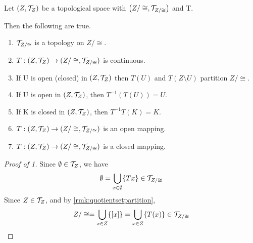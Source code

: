 
\begin{prop}
    \label{prop:QuotientSpaceTopology}
    
    Let $(Z,\mathcal{T}_Z)$ be a topological space 
    with \QuotientTopologicalSpace  $\left( Z/\cong, \mathcal{T}_{Z/\cong}\right)$
    and \QuotientMap T.
    
    Then the following are true. 
    \begin{enumerate}
        \item $\mathcal{T}_{Z/\cong}$ is a topology on $Z/\cong$. 
        \item $T:(Z, \mathcal{T}_Z) \to (Z/\cong, \mathcal{T}_{Z/\cong})$ is continuous. 
        \item If U is open (closed) in $(Z,\mathcal{T}_Z)$ then $T(U)$ and $T(Z\setminus U)$ partition $Z/\cong$. 
        \item If U is open in $(Z, \mathcal{T}_Z)$, then $T^{-1}(T(U))=U$. 
        \item If K is closed in $(Z,\mathcal{T}_Z)$, then $T^{-1}T(K)=K$. 
        \item $T:(Z, \mathcal{T}_Z) \to (Z/\cong, \mathcal{T}_{Z/\cong})$ is an open mapping. 
        \item $T:(Z, \mathcal{T}_Z) \to (Z/\cong, \mathcal{T}_{Z/\cong})$ is a  closed mapping.
        
    \end{enumerate} 
    \begin{proof}[Proof of 1]
        Since $\emptyset \in \mathcal{T}_Z$, we have 
        \begin{equation}
            \emptyset = \bigcup\limits_{x \in \emptyset} \{Tx\} \in \mathcal{T}_{Z/\cong}
        \end{equation}
        Since $Z \in \mathcal{T}_Z$, and by \ref{rmk:quotientsetpartition}, 
        \begin{equation} 
            Z/\cong = \bigcup_{x \in Z} \{[x]\}= \bigcup\limits_{x \in Z} \{T(x)\} \in \mathcal{T}_{Z/\cong}
        \end{equation} 
        

\end{proof}
\end{prop}
